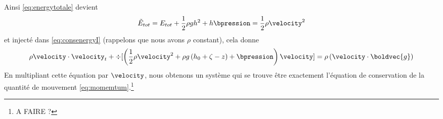 Ainsi \eqref{eq:energytotale} devient
\begin{equation}
	\tilde{E}_{tot} = E_{tot} + \frac{1}{2}\rho g h^2 + h\bpression = \frac{1}{2}\rho\velocity^2\label{eq:energytotale2}
\end{equation}
et injecté dans \eqref{eq:consenergyI} (rappelons que nous avons $\rho$ constant), cela donne
\begin{equation}
	\rho\velocity \cdot \velocity_t + \div[\left(\frac{1}{2}\rho\velocity^2 + \rho g \left(h_0 + \zeta - z\right) + \bpression\right)\velocity] = \rho \left(\velocity \cdot\boldvec{g} \right)
\end{equation}
En multipliant cette équation par $\velocity$, nous obtenons un système qui se trouve être exactement l'équation de conservation de la quantité de mouvement \eqref{eq:momemtum}.\footnote{A FAIRE ?}


